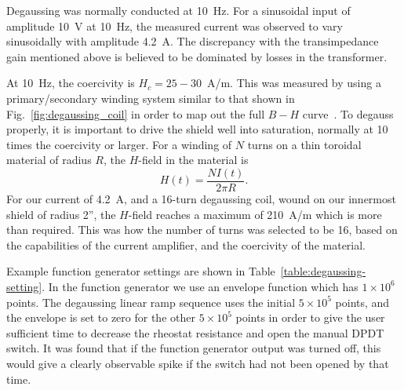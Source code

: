 Degaussing was normally conducted at 10~Hz.  For a sinusoidal input of
amplitude 10~V at 10~Hz, the measured current was observed to vary
sinusoidally with amplitude 4.2~A.  The discrepancy with the
transimpedance gain mentioned above is believed to be dominated by
losses in the transformer.

At 10~Hz, the coercivity is $H_c=25-30$~A/m.  This was measured by using
a primary/secondary winding system similar to that shown in
Fig.~\ref{fig:degaussing_coil} in order to map out the full $B-H$
curve~\cite{bib:henri-week-10}.  To degauss properly, it is
important to drive the shield well into saturation, normally at 10
times the coercivity or larger.  For a winding of $N$ turns on a thin
toroidal material of radius $R$, the $H$-field in the material
is~\cite{Andalib:2016ahj}
\begin{equation}
H(t)=\frac{NI(t)}{2\pi R}.
\end{equation}
For our current of 4.2~A, and a 16-turn degaussing coil, wound on our
innermost shield of radius 2'', the $H$-field reaches a maximum of
210~A/m which is more than required.  This was how the number of turns
was selected to be 16, based on the capabilities of the current
amplifier, and the coercivity of the material.

Example function generator settings are shown in
Table~\ref{table:degaussing-setting}.  In the function generator we
use an envelope function which has $1\times 10^6$ points. The
degaussing linear ramp sequence uses the initial $5\times 10^5$
points, and the envelope is set to zero for the other $5\times 10^5$
points in order to give the user sufficient time to decrease the
rheostat resistance and open the manual DPDT switch.  It was found
that if the function generator output was turned off, this would give
a clearly observable spike if the switch had not been opened by that
time.

